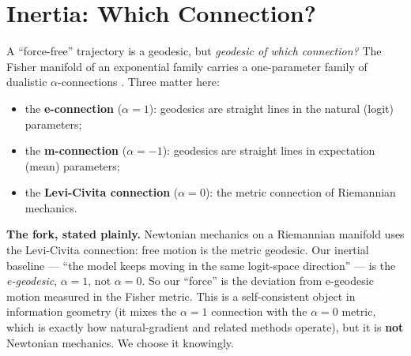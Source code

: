 \documentclass[11pt]{article}
\begin{document}
\section{Inertia: Which Connection?}
\label{sec:connection-fork}

A ``force-free'' trajectory is a geodesic, but \emph{geodesic of which connection?} The Fisher manifold of an exponential family carries a one-parameter family of dualistic $\alpha$-connections \cite{amari}. Three matter here:
\begin{itemize}[leftmargin=1.5em]
  \item the \textbf{e-connection} ($\alpha=1$): geodesics are straight lines in the natural (logit) parameters;
  \item the \textbf{m-connection} ($\alpha=-1$): geodesics are straight lines in expectation (mean) parameters;
  \item the \textbf{Levi-Civita connection} ($\alpha=0$): the metric connection of Riemannian mechanics.
\end{itemize}

\begin{honestbox}
\textbf{The fork, stated plainly.} Newtonian mechanics on a Riemannian manifold uses the Levi-Civita connection: free motion is the metric geodesic. Our inertial baseline --- ``the model keeps moving in the same logit-space direction'' --- is the \emph{e-geodesic}, $\alpha=1$, not $\alpha=0$. So our ``force'' is the deviation from e-geodesic motion measured in the Fisher metric. This is a self-consistent object in information geometry (it mixes the $\alpha=1$ connection with the $\alpha=0$ metric, which is exactly how natural-gradient and related methods operate), but it is \textbf{not} Newtonian mechanics. We choose it knowingly.
\end{honestbox}
\end{document}

